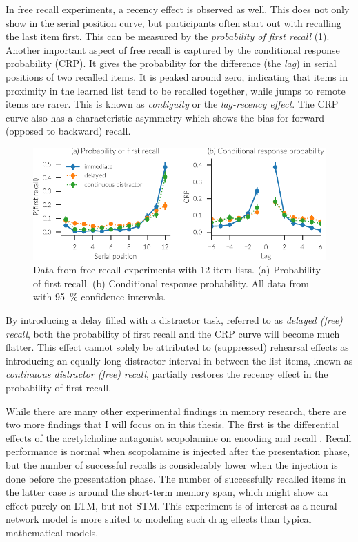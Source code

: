 In free recall experiments, a recency effect is observed as well.
This does not only show in the serial position curve, but participants often start out with recalling the last item first.
This can be measured by the \emph{probability of first recall} (\cref{fig:exp-free-recall}).
Another important aspect of free recall is captured by the conditional response probability (CRP).
It gives the probability for the difference (the \emph{lag}) in serial positions of two recalled items.
It is peaked around zero, indicating that items in proximity in the learned list tend to be recalled together, while jumps to remote items are rarer.
This is known as \emph{contiguity} or the \emph{lag-recency effect}.
The CRP curve also has a characteristic asymmetry which shows the bias for forward (opposed to backward) recall.
\begin{figure}
    \centering
    \includegraphics{figures/exp-free-recall}
    \caption[Free recall probablitiy of first recall and CRP.]{Data from free recall experiments with 12 item lists. (a) Probability of first recall. (b) Conditional response probability. All data from \textcite{Howard1999} with \SI{95}{\percent} confidence intervals.}\label{fig:exp-free-recall}
\end{figure}

By introducing a delay filled with a distractor task, referred to as \emph{delayed (free) recall}, both the probability of first recall and the CRP curve will become much flatter.
This effect cannot solely be attributed to (suppressed) rehearsal effects as introducing an equally long distractor interval in-between the list items, known as \emph{continuous distractor (free) recall}, partially restores the recency effect in the probability of first recall.

While there are many other experimental findings in memory research, there are two more findings that I will focus on in this thesis.
The first is the differential effects of the acetylcholine antagonist scopolamine on encoding and recall \parencite{ghoneim1975}.
Recall performance is normal when scopolamine is injected after the presentation phase, but the number of successful recalls is considerably lower when the injection is done before the presentation phase.
The number of successfully recalled items in the latter case is around the short-term memory span, which might show an effect purely on LTM, but not STM\@.
This experiment is of interest as a neural network model is more suited to modeling such drug effects than typical mathematical models.

